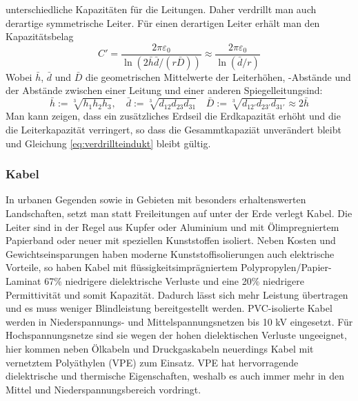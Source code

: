 unterschiedliche Kapazitäten für die Leitungen. Daher verdrillt man auch derartige symmetrische Leiter. Für einen derartigen Leiter erhält man den Kapazitätsbelag
\begin{equation}\label{eq:verdrillteindukt}
C' = \frac{2\pi\varepsilon_0}{\ln\left(2 \bar{h}\bar{d}/(r\bar{D})\right) } \approx
\frac{2\pi\varepsilon_0}{\ln\left(\bar{d}/r\right)}
\end{equation}
Wobei $\bar{h}$, $\bar{d}$ und $\bar{D}$ die geometrischen Mittelwerte der Leiterhöhen, -Abstände und der Abstände zwischen einer Leitung und einer anderen \q Spiegelleitung\qe sind:
\begin{equation}
\bar{h} := \sqrt[3]{h_1h_2h_3}, \quad \bar{d} := \sqrt[3]{d_{12}d_{23}d_{31}} \quad \bar{D} := \sqrt[3]{d_{12'}d_{23'}d_{31'}} \approx 2\bar{h}
\end{equation}
Man kann zeigen, dass ein zusätzliches Erdseil die Erdkapazität erhöht und die die Leiterkapazität verringert, so dass die Gesammtkapaziät unverändert bleibt und Gleichung \eqref{eq:verdrillteindukt} bleibt gültig.\cite{Flosdorff}


\subsubsection{Kabel}
In urbanen Gegenden sowie in Gebieten mit besonders erhaltenswerten Landschaften, setzt man statt Freileitungen auf unter der Erde verlegt Kabel. Die Leiter sind in der Regel aus Kupfer oder Aluminium und mit Ölimpregniertem Papierband oder neuer mit speziellen Kunststoffen isoliert. 
Neben Kosten und Gewichtseinsparungen haben moderne Kunststoffisolierungen auch elektrische Vorteile, so haben Kabel mit flüssigkeitsimprägniertem Polypropylen/Papier-Laminat 67\% niedrigere dielektrische Verluste und eine 20\% niedrigere Permittivität und somit Kapazität.\cite{Harrison} Dadurch lässt sich mehr Leistung übertragen und es muss weniger Blindleistung bereitgestellt werden.
PVC-isolierte Kabel werden in Niederspannungs- und Mittelspannungsnetzen bis 10 kV eingesetzt. Für Hochspannungsnetze sind sie wegen der hohen dielektischen Verluste ungeeignet, hier kommen neben Ölkabeln und Druckgaskabeln neuerdings Kabel mit vernetztem Polyäthylen (VPE) zum Einsatz. VPE hat hervorragende dielektrische und thermische Eigenschaften, weshalb es auch immer mehr in den Mittel und Niederspannungsbereich vordringt.\cite{Flosdorff}


